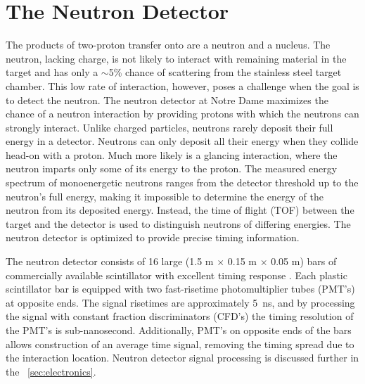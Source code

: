 \section{The Neutron Detector}
\label{sec:detector}

The products of two-proton transfer onto \GeTargets are a neutron and a \SeProducts nucleus.  The neutron, lacking charge, is not likely to interact with remaining material in the target and has only a $\sim$5\% chance of scattering from the stainless steel target chamber.  This low rate of interaction, however, poses a challenge when the goal is to detect the neutron.  The neutron detector at Notre Dame maximizes the chance of a neutron interaction by providing protons with which the neutrons can strongly interact.  Unlike charged particles, neutrons rarely deposit their full energy in a detector.  Neutrons can only deposit all their energy when they collide head-on with a proton.  Much more likely is a glancing interaction, where the neutron imparts only some of its energy to the proton.  The measured energy spectrum of monoenergetic neutrons ranges from the detector threshold up to the neutron's full energy, making it impossible to determine the energy of the neutron from its deposited energy.  Instead, the time of flight (TOF) between the target and the detector is used to distinguish neutrons of differing energies.  The neutron detector is optimized to provide precise timing information.       

The neutron detector \cite{KolataNeutwall} consists of 16 large (1.5 m $\times$ 0.15 m $\times$ 0.05 m) bars of commercially available scintillator with excellent timing response \cite{BC408}.  Each plastic scintillator bar is equipped with two fast-risetime photomultiplier tubes (PMT's) at opposite ends.  The signal risetimes are approximately 5~ns, and by processing the signal with constant fraction discriminators (CFD's) the timing resolution of the PMT's is sub-nanosecond.  Additionally, PMT's on opposite ends of the bars allows construction of an average time signal, removing the timing spread due to the interaction location.  Neutron detector signal processing is discussed further in the {\sect}~\ref{sec:electronics}.

